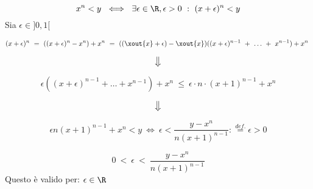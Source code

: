 


\maketitle

\begin{dimo}[$x^n < y$]

	\begin{equation}
	x^n < y \ \iff\ \exists\epsilon \in \R, 
	\epsilon > 0 \ :\ (x + \epsilon)^n < y
	\end{equation}
Sia $\epsilon \in ]0,1[$

	\begin{equation}
	(x + \epsilon)^n\ =\ ((x + \epsilon)^n - x^n) + x^n\ =\
	((\xout{x} + \epsilon)- \xout{x})((x+ \epsilon)^{n-1}\ +\	
	\dots\ +\ x^{n-1}) + x^n\
	\end{equation}
	
	\begin{equation}
	\big\Downarrow
	\end{equation}

	\begin{equation}
	\epsilon ( (x + \epsilon)^{n-1} + \dots + x^{n-1}) + x^n\ \leq\
	\epsilon \cdot n \cdot (x + 1)^{n-1} + x^n
	\end{equation}

	\begin{equation}
	\big\Downarrow
	\end{equation}
	
	\begin{equation}
	\epsilon n (x+1)^{n-1} + x^n < y \ \iff\ 
	\epsilon < \frac{y - x^n}{n(x+1)^{n-1}} : \overset{def.}{=} \epsilon > 0
	\end{equation}

	\begin{equation}
	0\ <\ \epsilon\ <\ \frac{y - x^n}{n(x+1)^{n-1}} 	
	\end{equation}
Questo è valido per: $ \epsilon \in \R $ 

		
\end{dimo}


